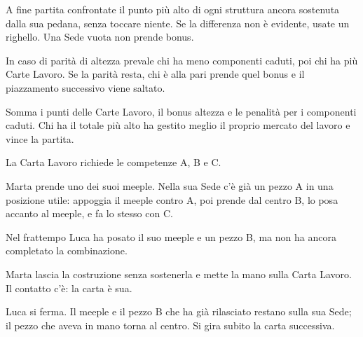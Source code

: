\documentclass[10pt,a4paper]{article}
\newcommand{\titolo}[1]{\par\vspace{4.2mm}\noindent{\color{accento}\rule{11mm}{2.4pt}}\par\vspace{1mm}\noindent{\fontsize{15}{17}\selectfont\bfseries\MakeUppercase{#1}}\par\vspace{1.2mm}}
\newcommand{\sottotitolo}[1]{\par\vspace{2.2mm}\noindent{\fontsize{10.5}{12.5}\selectfont\bfseries #1}\par\vspace{-.6mm}}
\newcommand{\meeple}[4][petrolio]{%
  \begin{scope}[shift={(#2)},rotate=#4,scale=#3]
    \fill[#1,rounded corners=#3*.42mm] (-1,7.1) -- (-4.1,5.7) -- (-4.5,5) -- (-4.1,4.2) -- (-1.8,4.6) -- (-3.4,.3) -- (-3,0) -- (-.8,0) -- (0,1.9) -- (.8,0) -- (3,0) -- (3.4,.3) -- (1.8,4.6) -- (4.1,4.2) -- (4.5,5) -- (4.1,5.7) -- (1,7.1) -- cycle;
    \fill[#1] (0,8.2) circle (1.75);
  \end{scope}}
\newcommand{\pezzo}[4][0]{%
  \begin{scope}[shift={(#2)},rotate=#1]
    \fill[black,opacity=.18,rounded corners=.6mm] (-2.5+.4,-2.5-.5) rectangle (2.5+.4,2.5-.5);
    \fill[#3,rounded corners=.6mm] (-2.5,-2.5) rectangle (2.5,2.5);
    \node[text=white,font=\fontsize{8}{8}\selectfont\bfseries,inner sep=0,rotate=#1] at (0,0) {#4};
  \end{scope}}
\newcommand{\pedana}[3]{\fill[petrolio,rounded corners=.5mm] (#1,#2-1.8) rectangle (#1+#3,#2);}
\begin{document}
A fine partita confrontate il punto più alto di ogni struttura ancora sostenuta dalla sua pedana, senza toccare niente. Se la differenza non è evidente, usate un righello. Una Sede vuota non prende bonus.

In caso di parità di altezza prevale chi ha meno componenti caduti, poi chi ha più Carte Lavoro. Se la parità resta, chi è alla pari prende quel bonus e il piazzamento successivo viene saltato.

\sottotitolo{Vittoria}

Somma i punti delle Carte Lavoro, il bonus altezza e le penalità per i componenti caduti. Chi ha il totale più alto ha gestito meglio il proprio mercato del lavoro e vince la partita.

\clearpage
\titolo{Esempio di round}

\noindent\begin{minipage}[c]{.50\linewidth}\setlength{\parskip}{1.9mm}\raggedright
La Carta Lavoro richiede le competenze A, B e C.

Marta prende uno dei suoi meeple. Nella sua Sede c'è già un pezzo A in una posizione utile: appoggia il meeple contro A, poi prende dal centro B, lo posa accanto al meeple, e fa lo stesso con C.

Nel frattempo Luca ha posato il suo meeple e un pezzo B, ma non ha ancora completato la combinazione.

Marta lascia la costruzione senza sostenerla e mette la mano sulla Carta Lavoro. Il contatto c'è: la carta è sua.

Luca si ferma. Il meeple e il pezzo B che ha già rilasciato restano sulla sua Sede; il pezzo che aveva in mano torna al centro. Si gira subito la carta successiva.
\end{minipage}\hfill
\begin{minipage}[c]{.46\linewidth}
\end{minipage}
\end{document}
